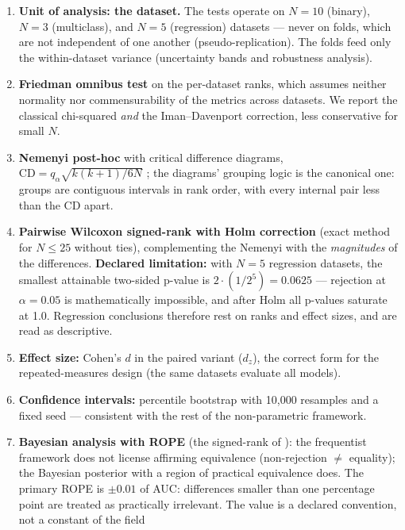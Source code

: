 \begin{enumerate}
  \item \textbf{Unit of analysis: the dataset.} The tests operate on
    $N=10$ (binary), $N=3$ (multiclass), and $N=5$ (regression)
    datasets --- never on folds, which are not independent of one
    another (pseudo-replication). The folds feed only the
    within-dataset variance (uncertainty bands and robustness
    analysis).
  \item \textbf{Friedman omnibus test} on the per-dataset ranks,
    which assumes neither normality nor commensurability of the
    metrics across datasets. We report the classical chi-squared
    \emph{and} the Iman--Davenport correction, less conservative for
    small $N$.
  \item \textbf{Nemenyi post-hoc} with critical difference diagrams,
    $\mathrm{CD} = q_\alpha \sqrt{k(k+1)/6N}$ \citep{demsar2006};
    the diagrams' grouping logic is the canonical one: groups are
    contiguous intervals in rank order, with every internal pair
    less than the CD apart.
  \item \textbf{Pairwise Wilcoxon signed-rank with Holm correction}
    (exact method for $N \le 25$ without ties), complementing the
    Nemenyi with the \emph{magnitudes} of the differences.
    \textbf{Declared limitation:} with $N=5$ regression datasets,
    the smallest attainable two-sided p-value is
    $2 \cdot (1/2^5) = 0.0625$ --- rejection at $\alpha = 0.05$ is
    mathematically impossible, and after Holm all p-values saturate
    at 1.0. Regression conclusions therefore rest on ranks and
    effect sizes, and are read as descriptive.
  \item \textbf{Effect size:} Cohen's $d$ in the paired variant
    ($d_z$), the correct form for the repeated-measures design (the
    same datasets evaluate all models).
  \item \textbf{Confidence intervals:} percentile bootstrap with
    10{,}000 resamples and a fixed seed --- consistent with the rest
    of the non-parametric framework.
  \item \textbf{Bayesian analysis with ROPE} (the signed-rank of
    \citealp{benavoli2017}): the frequentist framework does not
    license affirming equivalence (non-rejection $\neq$ equality);
    the Bayesian posterior with a region of practical equivalence
    does. The primary ROPE is $\pm 0.01$ of AUC: differences smaller
    than one percentage point are treated as practically irrelevant.
    The value is a declared convention, not a constant of the field

\end{enumerate}
